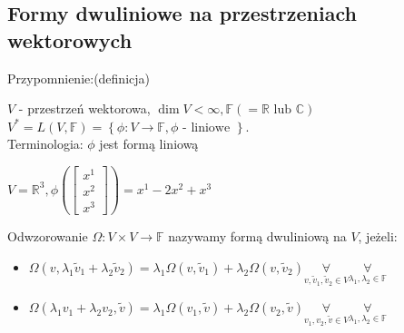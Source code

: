 \documentclass[../main.tex]{subfiles}
\begin{document}
    \subsection{
        Formy dwuliniowe na przestrzeniach wektorowych
    }

    Przypomnienie:(definicja)
    \begin{definicja}
        $V$ - przestrzeń wektorowa, $\dim V < \infty, \mathbb{F} (=\mathbb{R} \text{ lub } \mathbb{C})$\\
        $V^* = L(V,\mathbb{F}) = \left\{ \phi: V\to \mathbb{F}, \phi \text{ - liniowe } \right\} $. \\
        Terminologia: $\phi$ jest formą liniową
    \end{definicja}
    \begin{przyklad}
        $V = \mathbb{R}^3, \phi \left( \begin{bmatrix} x^1\\x^2\\x^3 \end{bmatrix}  \right) = x^1 - 2x^2 + x^3 $
    \end{przyklad}
    \begin{definicja}
        Odwzorowanie $\Omega: V \times V \to \mathbb{F}$ nazywamy formą dwuliniową na $V$, jeżeli:\\
        \begin{itemize}
            \item $\Omega(v,\lambda_1 \tilde v_1 + \lambda_2 \tilde v_2) = \lambda_1 \Omega(v,\tilde v_1) + \lambda_2 \Omega (v,\tilde v_2) \underset{v,\tilde v_1, \tilde v_2 \in V}{\forall} \underset{\lambda_1,\lambda_2\in \mathbb{F}}{\forall} $
            \item $\Omega(\lambda_1 v_1 + \lambda_2 v_2, \tilde v) = \lambda_1 \Omega(v_1,\tilde v) + \lambda_2 \Omega(v_2,\tilde v) \underset{v_1,v_2,\tilde v\in V}{\forall} \underset{\lambda_1,\lambda_2\in \mathbb{F}}{\forall} $
        \end{itemize}
    \end{definicja}
\end{document}

